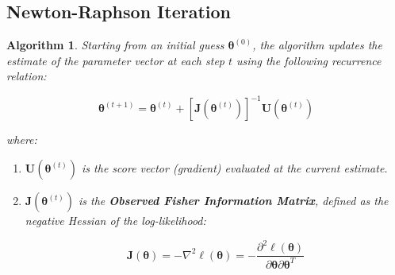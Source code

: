 \documentclass[
  letterpaper,
  DIV=11,
  numbers=noendperiod]{scrreprt}
\renewcommand{\[}{\begin{equation}}
\renewcommand{\]}{\end{equation}}
\theoremstyle{definition}
\theoremstyle{plain}
\newtheorem{algorithm}{Algorithm}[chapter]
\theoremstyle{plain}
\theoremstyle{plain}
\theoremstyle{definition}
\theoremstyle{plain}
\theoremstyle{remark}
\begin{document}
\subsection{Newton-Raphson Iteration}\label{newton-raphson-iteration}

\begin{algorithm}

Starting from an initial guess \(\boldsymbol{\theta}^{(0)}\), the
algorithm updates the estimate of the parameter vector at each step
\(t\) using the following recurrence relation:

\[
\boldsymbol{\theta}^{(t+1)} = \boldsymbol{\theta}^{(t)} + \left[ \mathbf{J}(\boldsymbol{\theta}^{(t)}) \right]^{-1} \mathbf{U}(\boldsymbol{\theta}^{(t)})
\]

where:

\begin{enumerate}
\def\labelenumi{\arabic{enumi}.}
\item
  \textbf{\(\mathbf{U}(\boldsymbol{\theta}^{(t)})\)} is the score vector
  (gradient) evaluated at the current estimate.
\item
  \textbf{\(\mathbf{J}(\boldsymbol{\theta}^{(t)})\)} is the
  \textbf{Observed Fisher Information Matrix}, defined as the negative
  Hessian of the log-likelihood:

  \[
  \mathbf{J}(\boldsymbol{\theta}) = - \nabla^2 \ell(\boldsymbol{\theta}) = - \frac{\partial^2 \ell(\boldsymbol{\theta})}{\partial \boldsymbol{\theta} \partial \boldsymbol{\theta}^T}
  \]
\end{enumerate}

\end{algorithm}
\end{document}
